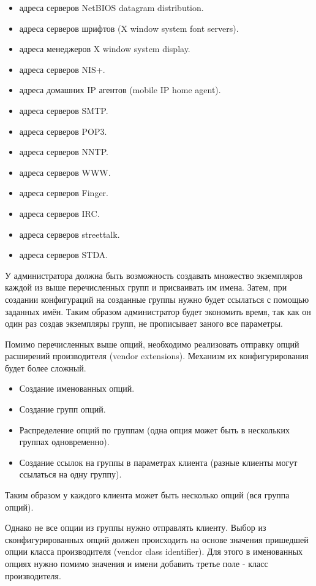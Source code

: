 \documentclass[14pt,a4paper]{extarticle}
\begin{document}
\begin{itemize}
\begin{itemize}
        \item адреса серверов NetBIOS datagram distribution.
        \item адреса серверов шрифтов (X window system font servers).
        \item адреса менеджеров X window system display.
        \item адреса серверов NIS+.
        \item адреса домашних IP агентов (mobile IP home agent).
        \item адреса серверов SMTP.
        \item адреса серверов POP3.
        \item адреса серверов NNTP.
        \item адреса серверов WWW.
        \item адреса серверов Finger.
        \item адреса серверов IRC.
        \item адреса серверов streettalk.
        \item адреса серверов STDA.
    \end{itemize}
\end{itemize}

У администратора должна быть возможность создавать множество экземпляров каждой из выше перечисленных групп и присваивать им имена.
Затем, при создании конфигураций на созданные группы нужно будет ссылаться с помощью заданных имён.
Таким образом администратор будет экономить время, так как он один раз создав экземпляры групп, не прописывает заного все параметры.

Помимо перечисленных выше опций, необходимо реализовать отправку опций расширений производителя (vendor extensions).
Механизм их конфигурирования будет более сложный.
\begin{itemize}
    \item Создание именованных опций.
    \item Создание групп опций.
    \item Распределение опций по группам (одна опция может быть в нескольких группах одновременно).
    \item Создание ссылок на группы в параметрах клиента (разные клиенты могут ссылаться на одну группу).
\end{itemize}

Таким образом у каждого клиента может быть несколько опций (вся группа опций).

Однако не все опции из группы нужно отправлять клиенту. Выбор из сконфигурированных опций должен происходить на основе значения пришедшей опции класса производителя (vendor class identifier). Для этого в именованных опциях нужно помимо значения и имени добавить третье поле - класс производителя.
\end{document}
